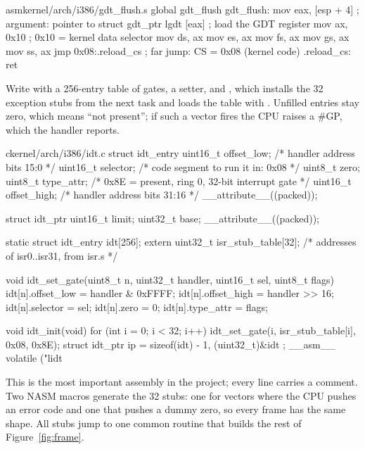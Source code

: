 \documentclass[11pt,a4paper]{article}
\begin{document}
\begin{lst}{asm}{kernel/arch/i386/gdt_flush.s}
global gdt_flush
gdt_flush:
    mov  eax, [esp + 4]     ; argument: pointer to struct gdt_ptr
    lgdt [eax]              ; load the GDT register
    mov  ax, 0x10           ; 0x10 = kernel data selector
    mov  ds, ax
    mov  es, ax
    mov  fs, ax
    mov  gs, ax
    mov  ss, ax
    jmp  0x08:.reload_cs    ; far jump: CS = 0x08 (kernel code)
.reload_cs:
    ret
\end{lst}

Write  with a 256-entry table of gates, a setter, and , which installs the
32 exception stubs from the next task and loads the table with . Unfilled entries stay zero, which
means ``not present''; if such a vector fires the CPU raises a \#GP, which the handler reports.

\begin{lst}{c}{kernel/arch/i386/idt.c}
struct idt_entry {
    uint16_t offset_low;    /* handler address bits 15:0            */
    uint16_t selector;      /* code segment to run it in: 0x08      */
    uint8_t  zero;
    uint8_t  type_attr;     /* 0x8E = present, ring 0, 32-bit interrupt gate */
    uint16_t offset_high;   /* handler address bits 31:16           */
} __attribute__((packed));

struct idt_ptr { uint16_t limit; uint32_t base; } __attribute__((packed));

static struct idt_entry idt[256];
extern uint32_t isr_stub_table[32];     /* addresses of isr0..isr31, from isr.s */

void idt_set_gate(uint8_t n, uint32_t handler, uint16_t sel, uint8_t flags)
{
    idt[n].offset_low  = handler & 0xFFFF;
    idt[n].offset_high = handler >> 16;
    idt[n].selector    = sel;
    idt[n].zero        = 0;
    idt[n].type_attr   = flags;
}

void idt_init(void)
{
    for (int i = 0; i < 32; i++)
        idt_set_gate(i, isr_stub_table[i], 0x08, 0x8E);
    struct idt_ptr ip = { sizeof(idt) - 1, (uint32_t)&idt };
    __asm__ volatile ("lidt %
}
\end{lst}

This is the most important assembly in the project; every line carries a comment. Two NASM macros
generate the 32 stubs: one for vectors where the CPU pushes an error code and one that pushes a dummy zero, so every
frame has the same shape. All stubs jump to one common routine that builds the rest of Figure~\ref{fig:frame}.
\end{document}
